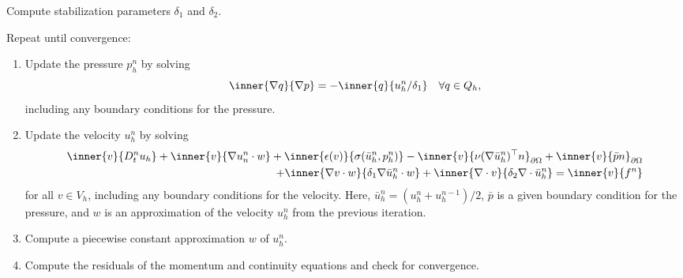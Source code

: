 {
  \item
    Compute stabilization parameters $\delta_1$ and $\delta_2$.

  \item
    Repeat until convergence:

    \begin{enumerate}
    \item
      Update the pressure $p^n_h$ by solving
      \begin{equation}\label{eq:g2_scheme,1}
        \inner{\nabla q}{\nabla p} = - \inner{q}{u_h^n/\delta_1}
        \quad \forall q \in Q_h,
      \end{equation}
      including any boundary conditions for the pressure.

    \item
      Update the velocity $u^n_h$ by solving
      \begin{equation}\label{eq:g2_scheme,2}
        \begin{split}
          \inner{v}{D_t^n u_h}
          + \inner{v}{\nabla u_n^n \cdot w}
          + \inner{\epsilon(v)}{\sigma(\bar{u}_h^n, p_h^n)}
          - \inner{v}{\nu (\nabla \bar{u}_h^n)^{\top} n}_{\partial\Omega}
          + \inner{v}{\bar{p} n}_{\partial\Omega} \\
          + \inner{\nabla v \cdot w}{\delta_1 \nabla \bar{u}_h^n \cdot w}
          + \inner{\nabla \cdot v}{\delta_2 \nabla \cdot \bar{u}_h^n}
          = \inner{v}{f^n}
        \end{split}
      \end{equation}
      for all $v \in V_h$, including any boundary conditions for the
      velocity. Here, $\bar{u}_h^n = (u_h^n + u_h^{n-1}) / 2$,
      $\bar{p}$ is a given boundary condition for the pressure, and
      $w$ is an approximation of the velocity $u^n_h$ from the
      previous iteration.

    \item
      Compute a piecewise constant approximation $w$ of $u^n_h$.

    \item
      Compute the residuals of the momentum and continuity equations
      and check for convergence.

    \end{enumerate}
}

